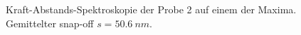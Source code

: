 \documentclass[
	a4paper,
	12pt,
	pagesize,
	ngerman
]{scrartcl}
\begin{document}
\begin{figure}[H]
			\caption{Kraft-Abstands-Spektroskopie der Probe 2 auf einem der Maxima. Gemittelter snap-off $s=\SI{50.6}{nm}$.} %
			\label{fig_cd_ds}
\end{figure}
\end{document}
